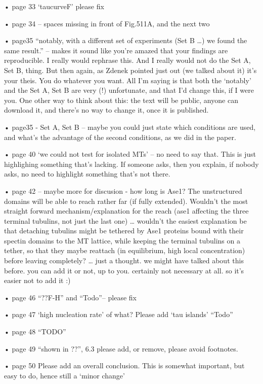 • page 33 ‘taucurveF’ please fix

• page 34 – spaces missing in front of Fig.511A, and the next two

• page35 “notably, with a different set of experiments (Set B …) we found the same result.” – makes it sound like you’re amazed that your findings are reproducible. I really would rephrase this. And I really would not do the Set A, Set B, thing. But then again, as Zdenek pointed just out (we talked about it) it’s your theis. You do whatever you want. All I’m saying is that both the ‘notably’ and the Set A, Set B are very (!) unfortunate, and that  I’d change this, if I were you. One other way to think about this: the text will be public, anyone can download it, and there’s no way to change it, once it is published.

• page35 - Set A, Set B – maybe you could just state which conditions are used, and what’s the advantage of the second conditions, as we did in the paper.

• page 40 ‘we could not test for isolated MTs’ – no need to say that. This is just highlighing something that’s lacking. If someone asks, then you explain, if nobody asks, no need to highlight something that’s not there.

• page 42 – maybe more for discusion - how long is Ase1? The unstructured domains will be able to reach rather far (if fully extended). Wouldn’t the most straight forward mechanism/explanation for the reach (ase1 affecting the three terminal tubulins, not just the last one) … wouldn’t the easiest explanation be that detaching tubulins might be tethered by Ase1 proteins bound with their spectin domains to the MT lattice, while keeping the terminal tubulins on a tether, so that they maybe reattach (in equilibrium, high local concentration) before leaving completely?
	… just a thought. we might have talked about this before. you can add it or not, up to you. certainly not necessary at all. so it’s easier not to add it :)

• page 46 “??F-H” and “Todo”– please fix

• page 47 ‘high nucleation rate’ of what? Please add ‘tau islands’ “Todo”

• page 48  “TODO”

• page 49  “shown in ??”, 6.3 please add, or remove, please avoid footnotes. 

• page 50  Please add an overall conclusion. This is somewhat important, but easy to do, hence still a ‘minor change’








